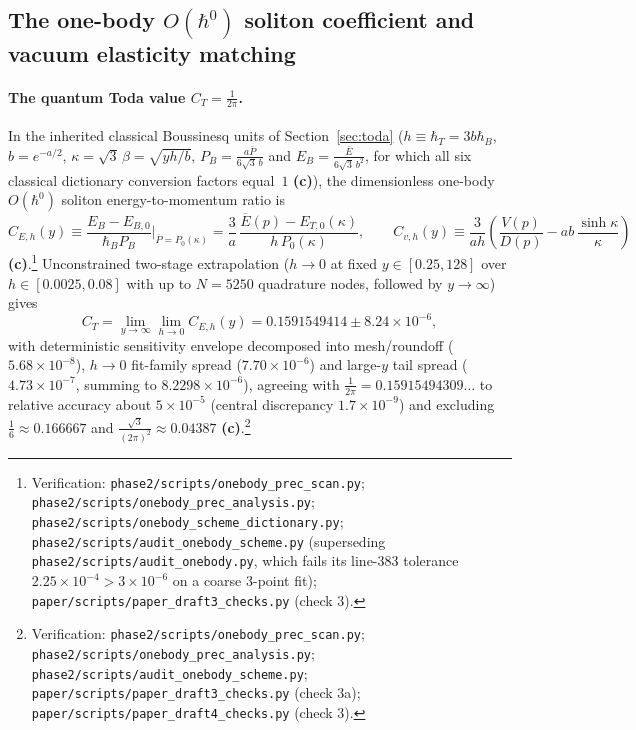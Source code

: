 \documentclass[11pt,a4paper]{article}
\newcommand{\lab}[1]{{\normalfont\sffamily\footnotesize\bfseries(#1)}}
\newcommand{\Lc}{\lab{c}}
\newcommand{\scr}[1]{\nolinkurl{#1}}
\newcommand{\chk}[1]{\footnote{\raggedright Verification: #1.}}
\newcommand{\hb}{\hbar}
\theoremstyle{remark}
\begin{document}
\subsection{The one-body \texorpdfstring{$O(\hb^0)$}{O(hbar\^0)} soliton coefficient and vacuum elasticity matching}\label{sec:onebody}

\paragraph{The quantum Toda value $C_T=\tfrac1{2\pi}$.} In the inherited classical Boussinesq units of Section~\ref{sec:toda} ($h\equiv\hb_T=3b\hb_B$, $b=e^{-a/2}$, $\kappa=\sqrt3\,\beta=\sqrt{yh/b}$, $P_B=\frac{a\overline P}{6\sqrt3\,b}$ and $E_B=\frac{\overline E}{6\sqrt3\,b^2}$, for which all six classical dictionary conversion factors equal~$1$ \Lc), the dimensionless one-body $O(\hb^0)$ soliton energy-to-momentum ratio is
\begin{equation}\label{eq:CEhdef}
C_{E,h}(y)\equiv\frac{E_B-E_{B,0}}{\hb_B P_B}\bigg|_{\overline P=P_0(\kappa)}
=\frac3a\,\frac{\overline E(p)-E_{T,0}(\kappa)}{h\,P_0(\kappa)},\qquad
C_{v,h}(y)\equiv\frac3{ah}\left(\frac{V(p)}{D(p)}-ab\,\frac{\sinh\kappa}{\kappa}\right)
\end{equation}
\Lc.\chk{\scr{phase2/scripts/onebody_prec_scan.py}; \scr{phase2/scripts/onebody_prec_analysis.py}; \scr{phase2/scripts/onebody_scheme_dictionary.py}; \scr{phase2/scripts/audit_onebody_scheme.py} (superseding \scr{phase2/scripts/audit_onebody.py}, which fails its line-383 tolerance $2.25\times10^{-4}>3\times10^{-6}$ on a coarse 3-point fit); \scr{paper/scripts/paper_draft3_checks.py} (check 3)}
Unconstrained two-stage extrapolation ($h\to0$ at fixed $y\in[0.25,128]$ over $h\in[0.0025,0.08]$ with up to $N=5250$ quadrature nodes, followed by $y\to\infty$) gives
\begin{equation}\label{eq:CTnum}
C_T=\lim_{y\to\infty}\lim_{h\to0}C_{E,h}(y)=0.1591549414\pm8.24\times10^{-6},
\end{equation}
with deterministic sensitivity envelope decomposed into mesh/roundoff ($5.68\times10^{-8}$), $h\to0$ fit-family spread ($7.70\times10^{-6}$) and large-$y$ tail spread ($4.73\times10^{-7}$, summing to $8.2298\times10^{-6}$), agreeing with $\frac1{2\pi}=0.15915494309\ldots$ to relative accuracy about $5\times10^{-5}$ (central discrepancy $1.7\times10^{-9}$) and excluding $\tfrac16\approx0.166667$ and $\frac{\sqrt3}{(2\pi)^2}\approx0.04387$ \Lc.\chk{\scr{phase2/scripts/onebody_prec_scan.py}; \scr{phase2/scripts/onebody_prec_analysis.py}; \scr{phase2/scripts/audit_onebody_scheme.py}; \scr{paper/scripts/paper_draft3_checks.py} (check 3a); \scr{paper/scripts/paper_draft4_checks.py} (check 3)}
\end{document}
